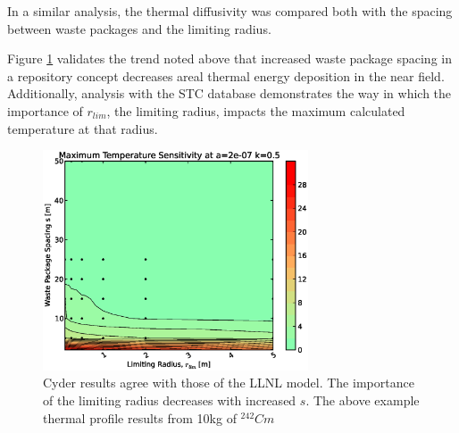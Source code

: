 In a similar analysis, the thermal diffusivity was compared both with the 
spacing between waste packages and the limiting radius. 

Figure \ref{fig:rs} validates the trend noted above that 
increased waste package spacing in a repository concept decreases areal thermal energy deposition 
in the near field.  Additionally, analysis with the \Cyder STC database 
demonstrates the way in which the importance of $r_{lim}$, the limiting radius, 
impacts the maximum calculated temperature at that radius. 

\begin{figure}[htbp!]
\begin{center}
\includegraphics[width=0.7\textwidth]{./chapters/demonstration/spacing/rs.eps}
\end{center}
\caption[Thermal Sensitivity to $s$ and $r_{lim}$ Sensitivity in \Cyder]
{Cyder results agree with those of the LLNL model. The importance of the 
limiting radius decreases with increased $s$. The above example thermal 
profile results from 10kg of $^{242}Cm$}
\label{fig:rs}
\end{figure}
